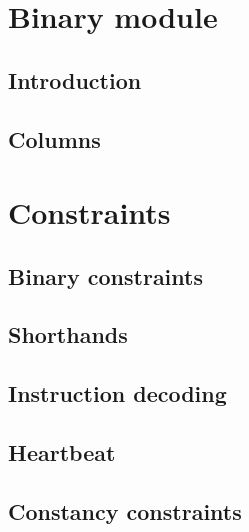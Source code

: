 \section{Binary module}
\subsection{Introduction}                                                               \label{bin: intro}                                        
\subsection{Columns}                                                                    \label{bin: columns}                                      

\section{Constraints}
\subsection{Binary constraints}                                                         \label{bin: binary}                                       
\subsection{Shorthands}                                                                 \label{bin: shorthands}                                   
\subsection{Instruction decoding}                                                       \label{bin: instruction decoding}                         
\subsection{Heartbeat}                                                                  \label{bin: heartbeat}                                    
\subsection{Constancy constraints}                                                      \label{bin: stamp constancies}                            

